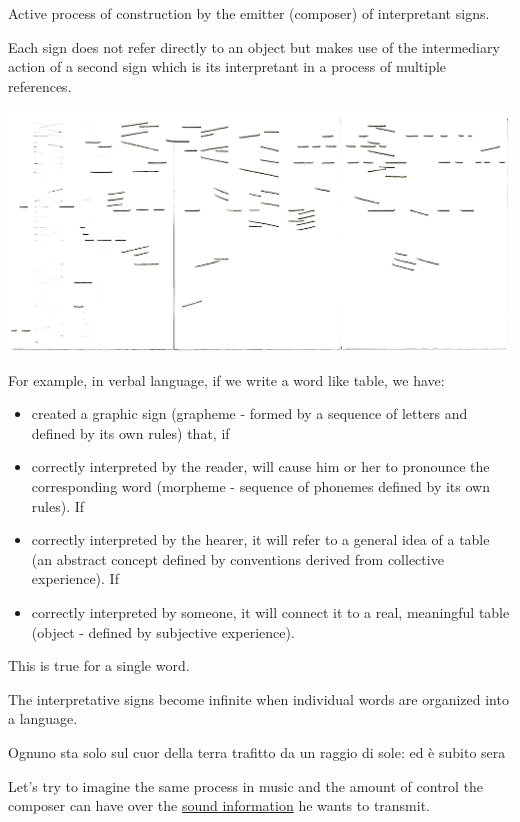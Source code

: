 Active process of construction by the emitter (composer) of interpretant signs.

Each sign does not refer directly to an object but makes use of the intermediary action of a second sign which is its interpretant in a process of multiple references.

\begin{center}
\includegraphics[scale=0.7]{../img/rimandi.png}
\end{center}

For example, in verbal language, if we write a word like table, we have:

\begin{itemize}
\tightlist
\item created a graphic sign (grapheme - formed by a sequence of letters and defined by its own rules) that, if
\item correctly interpreted by the reader, will cause him or her to pronounce the corresponding word (morpheme - sequence of phonemes defined by its own rules). If
\item correctly interpreted by the hearer, it will refer to a general idea of a table (an abstract concept defined by conventions derived from collective experience). If
\item correctly interpreted by someone, it will connect it to a real, meaningful table (object - defined by subjective experience).
\end{itemize}

This is true for a single word.

The interpretative signs become infinite when individual words are organized into a language.

Ognuno sta solo sul cuor della terra trafitto da un raggio di sole: ed è subito sera

Let's try to imagine the same process in music and the amount of control the composer can have over the \href{goldberg.mp3}{sound information} he wants to transmit.

